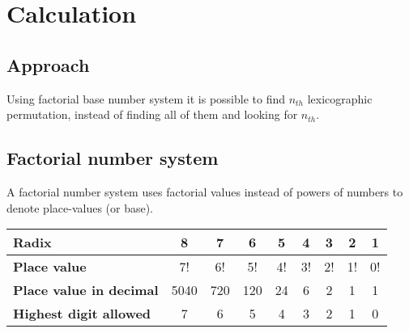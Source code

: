 \documentclass{article}
\begin{document}
\section{Calculation}
\subsection{Approach}
Using factorial base number system it is possible to find $n_{th}$ lexicographic
permutation, instead of finding all of them and looking for $n_{th}$.

\subsection{Factorial number system}
A factorial number system uses factorial values instead of powers of numbers
to denote place-values (or base). \newline

\begin{tabular}{ | l | c | c | c | c | c | c | c | c |}
    \hline
    \textbf{Radix}                  & 8    & 7   & 6   & 5  & 4  & 3  & 2  & 1  \\ \hline
    \textbf{Place value}            & 7!   & 6!  & 5!  & 4! & 3! & 2! & 1! & 0! \\ \hline
    \textbf{Place value in decimal} & 5040 & 720 & 120 & 24 & 6  & 2  & 1  & 1  \\ \hline
    \textbf{Highest digit allowed}  & 7    & 6   & 5   & 4  & 3  & 2  & 1  & 0  \\ \hline
\end{tabular}
\newline \newline
\end{document}

